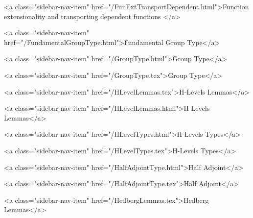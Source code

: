           <a class="sidebar-nav-item" href="/FunExtTransportDependent.html">Function extensionality and transporting dependent functions </a>
        
      
    
      
        
          <a class="sidebar-nav-item" href="/FundamentalGroupType.html">Fundamental Group Type</a>
        
      
    
      
        
          <a class="sidebar-nav-item" href="/GroupType.html">Group Type</a>
        
      
    
      
        
          <a class="sidebar-nav-item" href="/GroupType.tex">Group Type</a>
        
      
    
      
        
          <a class="sidebar-nav-item" href="/HLevelLemmas.tex">H-Levels Lemmas</a>
        
      
    
      
        
          <a class="sidebar-nav-item" href="/HLevelLemmas.html">H-Levels Lemmas</a>
        
      
    
      
        
          <a class="sidebar-nav-item" href="/HLevelTypes.html">H-Levels Types</a>
        
      
    
      
        
          <a class="sidebar-nav-item" href="/HLevelTypes.tex">H-Levels Types</a>
        
      
    
      
        
          <a class="sidebar-nav-item" href="/HalfAdjointType.html">Half Adjoint</a>
        
      
    
      
        
          <a class="sidebar-nav-item" href="/HalfAdjointType.tex">Half Adjoint</a>
        
      
    
      
        
          <a class="sidebar-nav-item" href="/HedbergLemmas.tex">Hedberg Lemmas</a>
        
      
    
